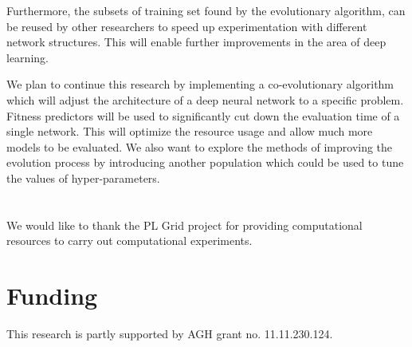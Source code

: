 \documentclass{llncs}
\begin{document}
Furthermore, the subsets of training set found by the evolutionary algorithm, can be reused by other researchers to speed up experimentation with different network structures. This will enable further improvements in the area of deep learning. 

We plan to continue this research by implementing a co-evolutionary algorithm which will adjust the architecture of a deep neural network to a specific problem. Fitness predictors will be used to significantly cut down the evaluation time of a single network. This will optimize the resource usage and allow much more models to be evaluated. We also want to explore the methods of improving the evolution process by introducing another population which could be used to tune the values of hyper-parameters.

\section*{\ackname} We would like to thank the PL Grid project for providing computational resources to carry out computational experiments.

\section*{Funding} This research is partly supported by AGH grant no. 11.11.230.124. 



\end{document}
